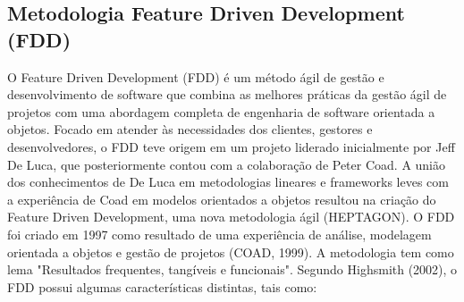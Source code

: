 \subsection{Metodologia Feature Driven Development (FDD)}
O Feature Driven Development (FDD) é um método ágil de gestão e desenvolvimento de software que combina as melhores práticas da gestão ágil de projetos com uma abordagem completa de engenharia de software orientada a objetos. Focado em atender às necessidades dos clientes, gestores e desenvolvedores, o FDD teve origem em um projeto liderado inicialmente por Jeff De Luca, que posteriormente contou com a colaboração de Peter Coad. A união dos conhecimentos de De Luca em metodologias lineares e frameworks leves com a experiência de Coad em modelos orientados a objetos resultou na criação do Feature Driven Development, uma nova metodologia ágil (HEPTAGON).
O FDD foi criado em 1997 como resultado de uma experiência de análise, modelagem orientada a objetos e gestão de projetos (COAD, 1999). A metodologia tem como lema "Resultados frequentes, tangíveis e funcionais". Segundo Highsmith (2002), o FDD possui algumas características distintas, tais como:
